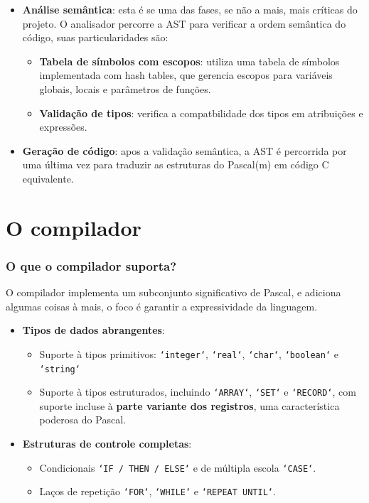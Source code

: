 \documentclass[
	11pt,
	aspectratio=169,
]{beamer}
\begin{document}
\begin{frame}
  \begin{itemize}
    \item \textbf{Análise semântica}: esta é se uma das fases, se não a mais, mais críticas do projeto. O analisador percorre a AST para verificar a ordem semântica do código, suas particularidades são:
      \begin{itemize}
        \item \textbf{Tabela de símbolos com escopos}:  utiliza uma tabela de símbolos implementada com hash tables, que gerencia escopos para variáveis globais, locais e parâmetros de funções.
        \item \textbf{Validação de tipos}: verifica a compatbilidade dos tipos em atribuições e expressões.
      \end{itemize}
    \item \textbf{Geração de código}: apos a validação semântica, a AST é percorrida por uma última vez para traduzir as estruturas do Pascal(m) em código C equivalente.
  \end{itemize}
\end{frame}

\section{O compilador}
\begin{frame}
  \frametitle{O que o compilador suporta?}
  O compilador implementa um subconjunto significativo de Pascal, e adiciona algumas coisas à mais, o foco é garantir a expressividade da linguagem.

  \begin{itemize}
    \item \textbf{Tipos de dados abrangentes}:
      \begin{itemize}
        \item Suporte à tipos primitivos: \texttt{`integer`}, \texttt{`real`}, \texttt{`char`}, \texttt{`boolean`} e \texttt{`string`}
        \item Suporte à tipos estruturados, incluindo \texttt{`ARRAY`}, \texttt{`SET`} e \texttt{`RECORD`}, com suporte incluse à \textbf{parte variante dos registros}, uma característica poderosa do Pascal.
      \end{itemize}
    \item \textbf{Estruturas de controle completas}:
      \begin{itemize}
        \item Condicionais \texttt{`IF / THEN / ELSE`} e de múltipla escola \texttt{`CASE`}.
        \item Laços de repetição \texttt{`FOR`}, \texttt{`WHILE`} e \texttt{`REPEAT UNTIL`}.
      \end{itemize}
  \end{itemize}
\end{frame}
\end{document}
